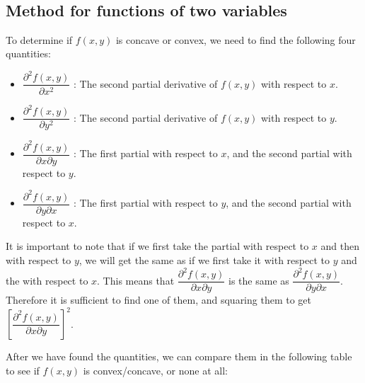 \documentclass[11pt]{article}
\providecommand{\tightlist}{%
      \setlength{\itemsep}{0pt}\setlength{\parskip}{0pt}}
\begin{document}
    \begin{center}
    \end{center}
    { \hspace*{\fill} \\}
    
    \hypertarget{method-for-functions-of-two-variables}{%
\subsection{Method for functions of two
variables}\label{method-for-functions-of-two-variables}}

    To determine if \(f(x,y)\) is concave or convex, we need to find the
following four quantities:

\begin{itemize}
\tightlist
\item
  \(\dfrac{\partial^2 f(x,y)}{\partial x^2}\) : The second partial
  derivative of \(f(x,y)\) with respect to \(x\).
\item
  \(\dfrac{\partial^2 f(x,y)}{\partial y^2}\) : The second partial
  derivative of \(f(x,y)\) with respect to \(y\).
\item
  \(\dfrac{\partial^2 f(x,y)}{\partial x \partial y}\) : The first
  partial with respect to \(x\), and the second partial with respect to
  \(y\).
\item
  \(\dfrac{\partial^2 f(x,y)}{\partial y \partial x}\) : The first
  partial with respect to \(y\), and the second partial with respect to
  \(x\).
\end{itemize}

    It is important to note that if we first take the partial with respect
to \(x\) and then with respect to \(y\), we will get the same as if we
first take it with respect to \(y\) and the with respect to \(x\). This
means that \(\dfrac{\partial^2 f(x,y)}{\partial x \partial y}\) is the
same as \(\dfrac{\partial^2 f(x,y)}{\partial y \partial x}\). Therefore
it is sufficient to find one of them, and squaring them to get
\(\left[\dfrac{\partial^2 f(x,y)}{\partial x \partial y}\right]^2\).

After we have found the quantities, we can compare them in the following
table to see if \(f(x,y)\) is convex/concave, or none at all:
\end{document}
